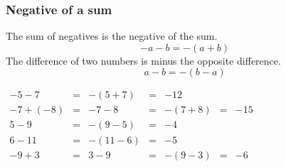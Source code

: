 \begin{frame}
\frametitle{Negative of a sum}
\begin{mathematicalRule}
The sum of negatives is the negative of the sum.
\[
- a - b = - (a+b)
\] 
The difference of two numbers is minus the opposite difference.
\[
a-b=-(b-a)
\]
\end{mathematicalRule}
\begin{example}
\hfil\hfil$
\begin{array}{rclclcl}
-5-7&=& -(5+7)&=&-12\\
-7+(-8)&=&-7-8&=&-(7+8)&=&-15\\
5-9&=&- (9-5)&=&-4\\
6-11&=&-(11-6)&=&-5\\
-9+3&=&3-9&=&-(9-3)&=&-6\\
\end{array}
$
\end{example}
\end{frame}